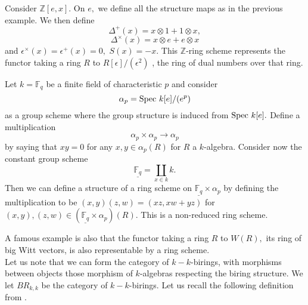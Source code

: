 \documentclass[a4paper, 12pt]{amsart}
\numberwithin{equation}{section}
\theoremstyle{definition}
\begin{document}
\begin{example}
Consider $\mathbb{Z}[e,x].$ On $e,$ we define all the structure
maps as in the previous example. We then define $$\Delta^+(x) =
x \otimes 1+ 1 \otimes x,$$ $$\Delta^\times(x) =
x \otimes e +e \otimes x$$ and
$\epsilon^\times(x)=\epsilon^+(x)=0,$ $S(x) = -
x.$ This $\mathbb{Z}$-ring scheme represents the functor taking a
ring $R$ to $R[\epsilon]/(\epsilon^2)$ , the ring of dual numbers
over that ring.
\end{example}

\begin{example}
Let $k = \mathbb{F}_q$ be a finite field of characteristic $p$ and
consider $$\alpha_p = \text{Spec } k[e]/(e^p)$$ as a group scheme where the group
structure is induced from $\text{Spec } k[e].$ Define a multiplication $$\alpha_p
\times \alpha_p \rightarrow \alpha_p$$ by saying that $xy=0$ for any $x,y \in
\alpha_p(R)$ for $R$ a $k$-algebra. Consider now the constant group scheme
$$\underline{\mathbb{F}_q}= \coprod_{x \in k} k.$$ Then we can define a
structure of a ring scheme on $\underline{\mathbb{F}_q} \times \alpha_p$ by
defining the multiplication to be $(x,y)(z,w) = (xz,xw+yz)$ for
$(x,y),(z,w) \in (\underline{\mathbb{F}_q} \times \alpha_p) (R).$ This is a
non-reduced ring scheme.
\end{example}
\noindent  A famous example is also that the functor taking a ring $R$ to $W(R),$
its ring of big Witt vectors, is also representable by a ring scheme.\\
\noindent Let us note that we can form the category of $k-k$-birings, with morphisms between objects those morphism of $k$-algebras respecting the biring structure. We let $BR_{k,k}$ be the category of $k-k$-birings.
Let us recall the following definition from \cite{BW}.
\end{document}
